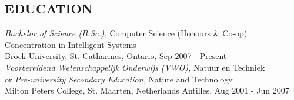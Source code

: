 \documentclass[margin]{res}
\begin{document}
\begin{resume}




\section{EDUCATION}
  {\sl Bachelor of Science (B.Sc.),} Computer Science (Honours \& Co-op) \\
  Concentration in Intelligent Systems \\
  Brock University, St. Catharines, Ontario, 
  \hfill Sep 2007 - Present \\
                
  {\sl Voorbereidend Wetenschappelijk Onderwijs (VWO),} Natuur en Techniek \\
  or {\sl Pre-university Secondary Education,} Nature and Technology \\
  Milton Peters College, St. Maarten, Netherlands Antilles, 
  \hfill Aug 2001 - Jun 2007 \\



\end{resume}
\end{document}
